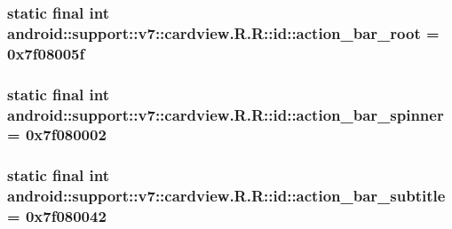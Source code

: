 \hypertarget{classandroid_1_1support_1_1v7_1_1cardview_1_1_r_1_1id_e8c529a6d0cef93a92b86f2cf0ee7fb6}{
\subsubsection[{action\_\-bar\_\-root}]{\setlength{\rightskip}{0pt plus 5cm}static final int android::support::v7::cardview.R.R::id::action\_\-bar\_\-root = 0x7f08005f}}
\label{classandroid_1_1support_1_1v7_1_1cardview_1_1_r_1_1id_e8c529a6d0cef93a92b86f2cf0ee7fb6}


\hypertarget{classandroid_1_1support_1_1v7_1_1cardview_1_1_r_1_1id_63036d4f8efd6042e46b2750d4fe4451}{
\subsubsection[{action\_\-bar\_\-spinner}]{\setlength{\rightskip}{0pt plus 5cm}static final int android::support::v7::cardview.R.R::id::action\_\-bar\_\-spinner = 0x7f080002}}
\label{classandroid_1_1support_1_1v7_1_1cardview_1_1_r_1_1id_63036d4f8efd6042e46b2750d4fe4451}


\hypertarget{classandroid_1_1support_1_1v7_1_1cardview_1_1_r_1_1id_dbe6d1e3f4a1033c328579c7086c3de6}{
\subsubsection[{action\_\-bar\_\-subtitle}]{\setlength{\rightskip}{0pt plus 5cm}static final int android::support::v7::cardview.R.R::id::action\_\-bar\_\-subtitle = 0x7f080042}}
\label{classandroid_1_1support_1_1v7_1_1cardview_1_1_r_1_1id_dbe6d1e3f4a1033c328579c7086c3de6}


